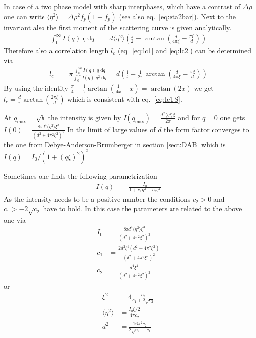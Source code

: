 In case of a two phase model with sharp interphases, which have a contrast of $\Delta\rho$
one can write $\langle\eta^2\rangle=\Delta\rho^2 f_p(1-f_p)$ (see also eq.\ \ref{eq:eta2bar}).
Next to the invariant also the first moment of the scattering curve is given analytically.
\begin{align}
      \int_0^\infty I(q)\; q \;\mathrm{d}q &=
       d \langle\eta^2\rangle \left(\frac{\pi}{2} -\arctan\left(\frac{d}{4 \pi  \xi }-\frac{\pi  \xi }{d}\right)\right)
\end{align}
Therefore also a correlation length $l_c$ (eq.\ \ref{eq:lc1} and \ref{eq:lc2}) can be determined via
\begin{align}
l_c &= \pi\frac{\int_0^\infty I(q)\; q \;\mathrm{d}q}{\int_0^\infty I(q)\; q^2 \;\mathrm{d}q}
     = d \left(\frac{1}{4} -\frac{1}{2\pi}\arctan\left(\frac{d}{4 \pi  \xi }-\frac{\pi  \xi }{d}\right)\right)
\end{align}
By using the identity $\frac{\pi}{4}-\frac{1}{2}\arctan\left(\frac{1}{4x}-x\right) = \arctan(2x)$ we get
$l_c = \frac{d}{\pi} \arctan\left(\frac{2 \pi  \xi }{d}\right)$ which is consistent with eq.\ \ref{eq:lcTS}.

At $q_\text{max}=\sqrt{b}$ the intensity is given by
$I(q_\text{max})=\frac{d^2\langle\eta^2\rangle \xi}{2\pi}$
and for $q=0$ one gets $I(0)=\frac{8\pi d^4\langle\eta^2\rangle\xi^3}{(d^2+4\pi^2\xi^2)^2}$
In the limit of large values of $d$ the form factor converges to the one from
Debye-Anderson-Brumberger in section \ref{sect:DAB} which is $I(q)=I_0/(1+(q\xi)^2)^2$

Sometimes one finds the following parametrization
\begin{align}
I(q) &= \frac{I_0}{1+c_1 q^2 + c_2 q^4}
\end{align}
As the intensity needs to be a positive number the conditions $c_2>0$ and $c_1>-2\sqrt{c_2}$ have to hold.
In this case the parameters are related to the above one via
\begin{align}
I_0 &= \frac{8 \pi  d^4 \langle\eta^2\rangle \xi^3}{\left(d^2+4 \pi^2 \xi^2\right)^2} \\
c_1 &=  \frac{2 d^2 \xi^2 \left(d^2-4 \pi^2 \xi^2\right)}{\left(d^2+4 \pi^2 \xi^2\right)^2} \\
c_2 &= \frac{d^4 \xi^4}{\left(d^2+4 \pi^2 \xi^2\right)^2}
\end{align}
or
\begin{align}
\xi^2 &= 4\frac{c_2}{c_1+2 \sqrt{c_2}} \\
\langle\eta^2\rangle &= \frac{I_0 \xi/2}{4 \pi  c_2} \\
d^2 &= \frac{16 \pi ^2 c_2}{2 \sqrt{c_2}-c_1}
\end{align}


